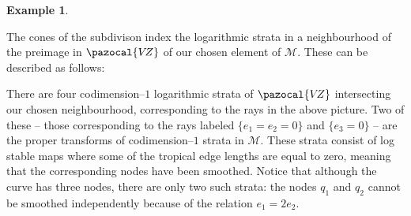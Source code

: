 \documentclass[11pt]{amsart}
\newcommand{\mathsq}[1]{#1}
\newcommand{\VZ}{\pazocal{V\!Z}}
\newcommand{\Mcal}{\mathcal{M}}
\theoremstyle{definition}
\theoremstyle{definition}
\newtheorem{example}[thm]{Example}
\begin{document}
\begin{example}
\begin{center}
\end{center}
The cones of the subdivison index the logarithmic strata in a neighbourhood of the preimage in $\VZ$ of our chosen element of $\Mcal$. These can be described as follows:
\begin{center}
\end{center}
There are four codimension--$1$ logarithmic strata of $\VZ$ intersecting our chosen neighbourhood, corresponding to the rays in the above picture. Two of these -- those corresponding to the rays labeled $\{ e_1=e_2=0 \}$ and $\{ e_3=0 \}$ -- are the proper transforms of codimension--$1$ strata in $\Mcal$. These strata consist of log stable maps where some of the tropical edge lengths are equal to zero, meaning that the corresponding nodes have been smoothed. Notice that although the curve has three nodes, there are only two such strata: the nodes $q_1$ and $q_2$ cannot be smoothed independently because of the relation $e_1=2e_2$.


\end{example}
\end{document}
